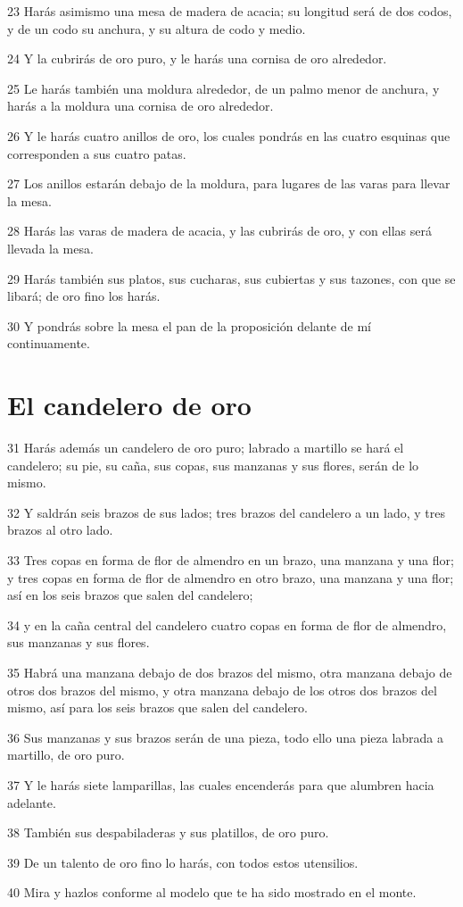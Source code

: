 \par 23 Harás asimismo una mesa de madera de acacia; su longitud será de dos codos,   y de un codo su anchura, y su altura de codo y medio.
\par 24 Y la cubrirás de oro puro, y le harás una cornisa de oro alrededor.
\par 25 Le harás también una moldura alrededor, de un palmo menor   de anchura, y harás a la moldura una cornisa de oro alrededor.
\par 26 Y le harás cuatro anillos de oro, los cuales pondrás en las cuatro esquinas que corresponden a sus cuatro patas.
\par 27 Los anillos estarán debajo de la moldura, para lugares de las varas para llevar la mesa.
\par 28 Harás las varas de madera de acacia, y las cubrirás de oro, y con ellas será llevada la mesa.
\par 29 Harás también sus platos, sus cucharas, sus cubiertas y sus tazones, con que se libará; de oro fino los harás.
\par 30 Y pondrás sobre la mesa el pan de la proposición delante de mí continuamente.

\section*{El candelero de oro}

\par 31 Harás además un candelero de oro puro; labrado a martillo se hará el candelero; su pie, su caña, sus copas, sus manzanas y sus flores, serán de lo mismo.
\par 32 Y saldrán seis brazos de sus lados; tres brazos del candelero a un lado, y tres brazos al otro lado.
\par 33 Tres copas en forma de flor de almendro en un brazo, una manzana y una flor; y tres copas en forma de flor de almendro en otro brazo, una manzana y una flor; así en los seis brazos que salen del candelero;
\par 34 y en la caña central del candelero cuatro copas en forma de flor de almendro, sus manzanas y sus flores.
\par 35 Habrá una manzana debajo de dos brazos del mismo, otra manzana debajo de otros dos brazos del mismo, y otra manzana debajo de los otros dos brazos del mismo, así para los seis brazos que salen del candelero.
\par 36 Sus manzanas y sus brazos serán de una pieza, todo ello una pieza labrada a martillo, de oro puro.
\par 37 Y le harás siete lamparillas, las cuales encenderás para que alumbren hacia adelante.
\par 38 También sus despabiladeras y sus platillos, de oro puro.
\par 39 De un talento de oro   fino lo harás, con todos estos utensilios.
\par 40 Mira y hazlos conforme al modelo que te ha sido mostrado en el monte.

